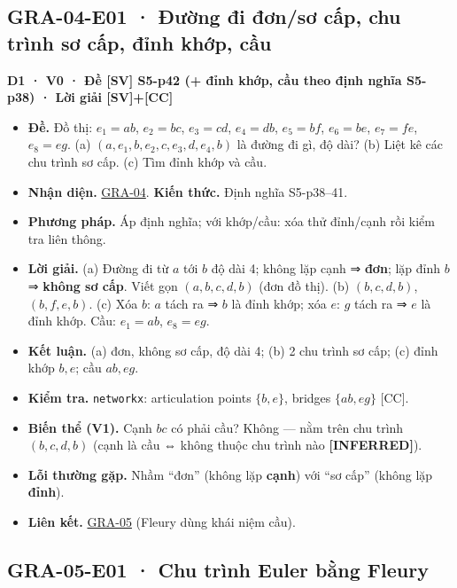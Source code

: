 \documentclass[
  10pt,
  twoside,openany]{book}
\providecommand{\tightlist}{%
  \setlength{\itemsep}{0pt}\setlength{\parskip}{0pt}}
\begin{document}
\hypertarget{GRA-04-E01}{%
\subsection{GRA-04-E01 · Đường đi đơn/sơ cấp, chu trình sơ cấp, đỉnh
khớp, cầu}\label{GRA-04-E01}}

\textbf{D1 · V0 · Đề {[}SV{]} S5-p42 (+ đỉnh khớp, cầu theo định nghĩa
S5-p38) · Lời giải {[}SV{]}+{[}CC{]}}

\begin{itemize}
\tightlist
\item
  \textbf{Đề.} Đồ thị: \(e_1=ab\), \(e_2=bc\), \(e_3=cd\), \(e_4=db\),
  \(e_5=bf\), \(e_6=be\), \(e_7=fe\), \(e_8=eg\). (a)
  \((a,e_1,b,e_2,c,e_3,d,e_4,b)\) là đường đi gì, độ dài? (b) Liệt kê
  các chu trình sơ cấp. (c) Tìm đỉnh khớp và cầu.
\item
  \textbf{Nhận diện.} \protect\hyperlink{GRA-04}{GRA-04}. \textbf{Kiến
  thức.} Định nghĩa S5-p38--41.
\item
  \textbf{Phương pháp.} Áp định nghĩa; với khớp/cầu: xóa thử đỉnh/cạnh
  rồi kiểm tra liên thông.
\item
  \textbf{Lời giải.} (a) Đường đi từ \(a\) tới \(b\) độ dài 4; không lặp
  cạnh ⇒ \textbf{đơn}; lặp đỉnh \(b\) ⇒ \textbf{không sơ cấp}. Viết gọn
  \((a,b,c,d,b)\) (đơn đồ thị). (b) \((b,c,d,b)\), \((b,f,e,b)\). (c)
  Xóa \(b\): \(a\) tách ra ⇒ \(b\) là đỉnh khớp; xóa \(e\): \(g\) tách
  ra ⇒ \(e\) là đỉnh khớp. Cầu: \(e_1=ab\), \(e_8=eg\).
\item
  \textbf{Kết luận.} (a) đơn, không sơ cấp, độ dài 4; (b) 2 chu trình sơ
  cấp; (c) đỉnh khớp \(b,e\); cầu \(ab, eg\).
\item
  \textbf{Kiểm tra.} \texttt{networkx}: articulation points \(\{b,e\}\),
  bridges \(\{ab, eg\}\) {[}CC{]}.
\item
  \textbf{Biến thể (V1).} Cạnh \(bc\) có phải cầu? Không --- nằm trên
  chu trình \((b,c,d,b)\) (cạnh là cầu ⇔ không thuộc chu trình nào
  \textbf{{[}INFERRED{]}}).
\item
  \textbf{Lỗi thường gặp.} Nhầm ``đơn'' (không lặp \textbf{cạnh}) với
  ``sơ cấp'' (không lặp \textbf{đỉnh}).
\item
  \textbf{Liên kết.} \protect\hyperlink{GRA-05}{GRA-05} (Fleury dùng
  khái niệm cầu).
\end{itemize}

\hypertarget{GRA-05-E01}{%
\subsection{GRA-05-E01 · Chu trình Euler bằng Fleury}\label{GRA-05-E01}}
\end{document}
